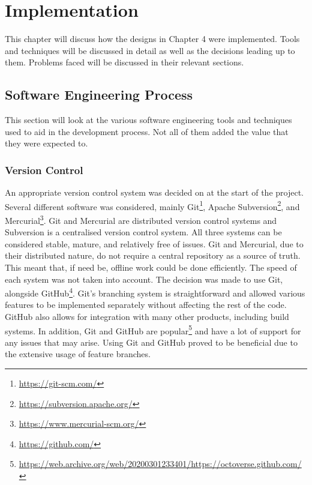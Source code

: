 \documentclass{l4proj}
\begin{document}
\chapter{Implementation} \label{implementation}
This chapter will discuss how the designs in Chapter 4 were implemented. Tools and techniques will be discussed in detail as well as the decisions leading up to them. Problems faced will be discussed in their relevant sections.

\section{Software Engineering Process}
This section will look at the various software engineering tools and techniques used to aid in the development process. Not all of them added the value that they were expected to.

\subsection{Version Control}
An appropriate version control system was decided on at the start of the project. Several different software was considered, mainly Git\footnote{\url{https://git-scm.com/}}, Apache Subversion\footnote{\url{https://subversion.apache.org/}}, and Mercurial\footnote{\url{https://www.mercurial-scm.org/}}. Git and Mercurial are distributed version control systems and Subversion is a centralised version control system. All three systems can be considered stable, mature, and relatively free of issues. Git and Mercurial, due to their distributed nature, do not require a central repository as a source of truth. This meant that, if need be, offline work could be done efficiently. The speed of each system was not taken into account. The decision was made to use Git, alongside GitHub\footnote{\url{https://github.com/}}. Git's branching system is straightforward and allowed various features to be implemented separately without affecting the rest of the code. GitHub also allows for integration with many other products, including build systems. In addition, Git and GitHub are popular\footnote{\url{https://web.archive.org/web/20200301233401/https://octoverse.github.com/}} and have a lot of support for any issues that may arise. Using Git and GitHub proved to be beneficial due to the extensive usage of feature branches.
\end{document}
